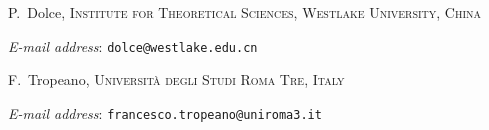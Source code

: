 \documentclass[10 pt,a4paper]{article}
\makeatletter
\theoremstyle{plain}
\theoremstyle{definition}
\theoremstyle{named}
\newcommand{\Addresses}{{
  \bigskip
  \bigskip
  \footnotesize
}

  P.~Dolce, \textsc{Institute for Theoretical Sciences, Westlake University, China}\par\nopagebreak
  \textit{E-mail address}: \texttt{dolce@westlake.edu.cn}

  \bigskip
  
F.~Tropeano, \textsc{Universit\`a degli Studi Roma Tre, Italy}\par\nopagebreak
  \textit{E-mail address}: \texttt{francesco.tropeano@uniroma3.it}
  
}
\makeatother
\begin{document}



 
\Addresses


 
\end{document}

